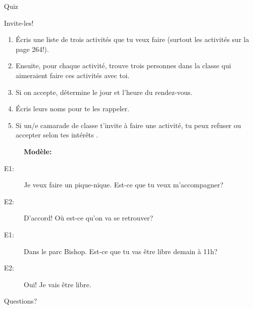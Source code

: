 \documentclass{beamer}
\begin{document}
  \begin{frame}{}
    \begin{center}
      \Large Quiz
    \end{center}
  \end{frame}

  \begin{frame}{Invite-les!}
    \small
    \begin{enumerate}
      \item Écris une liste de trois activités que tu veux faire (surtout les activités sur la page 264!).
      \item Ensuite, pour chaque activité, trouve trois personnes dans la classe qui aimeraient faire  ces activités avec toi.
      \item Si on accepte, détermine le jour et l'heure du rendez-vous.
      \item Écris leurs noms pour te les rappeler.
      \item Si un/e camarade de classe t'invite à faire une activité, tu peux refuser ou accepter selon tes intérêts .
    \end{enumerate}
    \begin{description}
      \item[] \textbf{Modèle:}
      \item[E1:] Je veux faire un pique-nique. Est-ce que tu veux m'accompagner?
      \item[E2:] D'accord! Où est-ce qu'on va se retrouver?
      \item[E1:] Dans le parc Bishop. Est-ce que tu vas être libre demain à 11h?
      \item[E2:] Oui! Je vais être libre.
    \end{description}
  \end{frame}

  \begin{frame}{}
    \begin{center}
      \Large Questions?
    \end{center}
  \end{frame}
\end{document}
